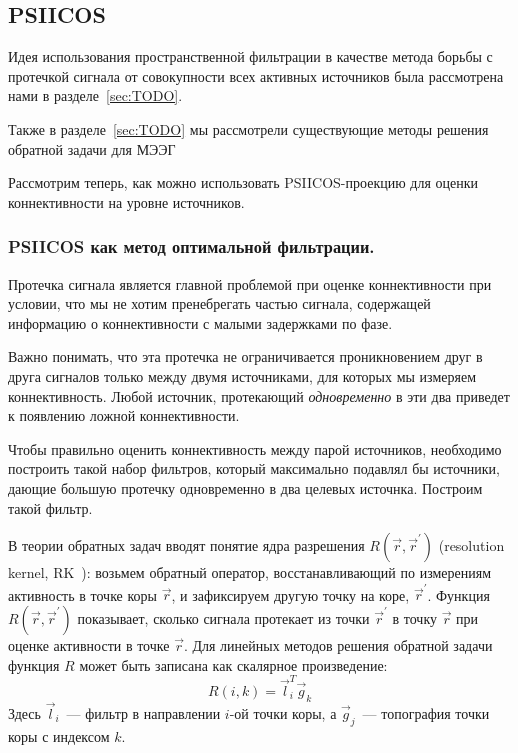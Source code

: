 \subsection{PSIICOS}
Идея использования пространственной фильтрации в качестве метода борьбы с
протечкой сигнала от совокупности всех активных источников была рассмотрена
нами в разделе~\ref{sec:TODO}.

Также в разделе~\ref{sec:TODO} мы рассмотрели существующие методы решения
обратной задачи для МЭЭГ

Рассмотрим теперь, как можно использовать PSIICOS-проекцию для оценки
коннективности на уровне источников.

\subsubsection{PSIICOS как метод оптимальной фильтрации.}

Протечка сигнала является главной проблемой при оценке коннективности при
условии, что мы не хотим пренебрегать частью сигнала, содержащей информацию
о коннективности с малыми задержками по фазе.

Важно понимать, что эта протечка не ограничивается проникновением друг в друга
сигналов только между двумя источниками, для которых мы измеряем
коннективность. Любой источник, протекающий \emph{одновременно} в эти два приведет
к появлению ложной коннективности.

Чтобы правильно оценить коннективность между парой источников,
необходимо построить такой набор фильтров, который максимально
подавлял бы источники, дающие большую протечку одновременно в два
целевых источнка. Построим такой фильтр.

В теории обратных задач вводят понятие ядра разрешения $R(\vec{r},
\vec{r}^{\prime})$ (resolution kernel, RK~\cite{sekikhara_nagarajan}): возьмем
обратный оператор, восстанавливающий по измерениям активность в точке коры
$\vec{r}$, и зафиксируем другую точку на коре, $\vec{r}^{\prime}$.  Функция
$R(\vec{r}, \vec{r}^{\prime})$ показывает, сколько сигнала протекает из точки
$\vec{r}^{\prime}$ в точку $\vec{r}$ при оценке активности в точке $\vec{r}$.
Для линейных методов решения обратной задачи функция $R$ может быть записана как
скалярное произведение:
\begin{equation}
    R(i, k) = \vec{l}_i^T \vec{g}_k
    \label{eq:resolution_kernel}
\end{equation}
Здесь $\vec{l}_i$~--- фильтр в направлении $i$-ой точки коры, а
$\vec{g}_j$~--- топография точки коры с индексом $k$.

